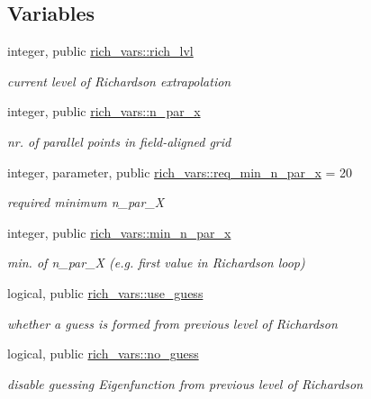 \subsection*{Variables}
\begin{DoxyCompactItemize}
\item 
integer, public \hyperlink{namespacerich__vars_a1b7734ba9ce6cc153b22387e638093c0}{rich\+\_\+vars\+::rich\+\_\+lvl}
\begin{DoxyCompactList}\small\item\em current level of Richardson extrapolation \end{DoxyCompactList}\item 
integer, public \hyperlink{namespacerich__vars_a7a32b8d53450cf925042cd5ddc7e23e6}{rich\+\_\+vars\+::n\+\_\+par\+\_\+x}
\begin{DoxyCompactList}\small\item\em nr. of parallel points in field-\/aligned grid \end{DoxyCompactList}\item 
integer, parameter, public \hyperlink{namespacerich__vars_a94e61b5125377ab3e984334998f5ebae}{rich\+\_\+vars\+::req\+\_\+min\+\_\+n\+\_\+par\+\_\+x} = 20
\begin{DoxyCompactList}\small\item\em required minimum {\ttfamily n\+\_\+par\+\_\+X} \end{DoxyCompactList}\item 
integer, public \hyperlink{namespacerich__vars_a07841cccca6e6ee59aeb4e0661558eda}{rich\+\_\+vars\+::min\+\_\+n\+\_\+par\+\_\+x}
\begin{DoxyCompactList}\small\item\em min. of {\ttfamily n\+\_\+par\+\_\+X} (e.\+g. first value in Richardson loop) \end{DoxyCompactList}\item 
logical, public \hyperlink{namespacerich__vars_aedc7171560db899c515d1610d99582c9}{rich\+\_\+vars\+::use\+\_\+guess}
\begin{DoxyCompactList}\small\item\em whether a guess is formed from previous level of Richardson \end{DoxyCompactList}\item 
logical, public \hyperlink{namespacerich__vars_a167fe55b5d9c1a4566729da683466947}{rich\+\_\+vars\+::no\+\_\+guess}
\begin{DoxyCompactList}\small\item\em disable guessing Eigenfunction from previous level of Richardson \end{DoxyCompactList}\item 

\end{DoxyCompactItemize}
